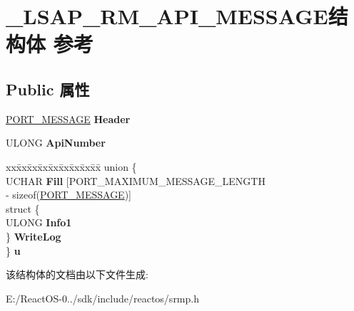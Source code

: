 \hypertarget{struct___l_s_a_p___r_m___a_p_i___m_e_s_s_a_g_e}{}\section{\+\_\+\+L\+S\+A\+P\+\_\+\+R\+M\+\_\+\+A\+P\+I\+\_\+\+M\+E\+S\+S\+A\+G\+E结构体 参考}
\label{struct___l_s_a_p___r_m___a_p_i___m_e_s_s_a_g_e}
\subsection*{Public 属性}
\begin{DoxyCompactItemize}
\item 
\mbox{\label{struct___l_s_a_p___r_m___a_p_i___m_e_s_s_a_g_e_a24b4871d37f5c580ed1d2df73ffbe52c}} 
\hyperlink{struct___p_o_r_t___m_e_s_s_a_g_e___h_e_a_d_e_r}{P\+O\+R\+T\+\_\+\+M\+E\+S\+S\+A\+GE} {\bfseries Header}
\item 
\mbox{\label{struct___l_s_a_p___r_m___a_p_i___m_e_s_s_a_g_e_a8243c3756f78ea62b6d1be66457bd20b}} 
U\+L\+O\+NG {\bfseries Api\+Number}
\item 
\mbox{\label{struct___l_s_a_p___r_m___a_p_i___m_e_s_s_a_g_e_a1bd2bba967bbf2f7645e83a67214fc04}} 
\begin{tabbing}
xx\=xx\=xx\=xx\=xx\=xx\=xx\=xx\=xx\=\kill
union \{\\
\>UCHAR {\bfseries Fill} \mbox{[}PORT\_MAXIMUM\_MESSAGE\_LENGTH \\
\>\>-\/ sizeof(\hyperlink{struct___p_o_r_t___m_e_s_s_a_g_e___h_e_a_d_e_r}{PORT\_MESSAGE})\mbox{]}\\
\>struct \{\\
\>\>ULONG {\bfseries Info1}\\
\>\} {\bfseries WriteLog}\\
\} {\bfseries u}\\

\end{tabbing}\end{DoxyCompactItemize}


该结构体的文档由以下文件生成\+:\begin{DoxyCompactItemize}
\item 
E\+:/\+React\+O\+S-\/0../sdk/include/reactos/srmp.\+h\end{DoxyCompactItemize}
